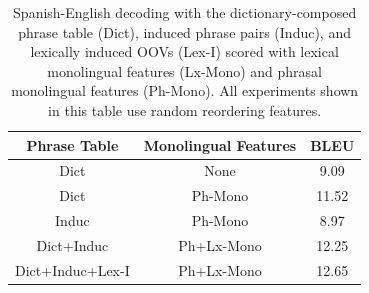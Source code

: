 \documentclass[11pt]{article}
\begin{document}
\begin{table}
\small
\begin{center}
\begin{tabular}{|c|c|c|}
\hline
Phrase Table & Monolingual Features & BLEU \\ %
\hline
Dict & None & 9.09 \\
Dict & Ph-Mono & 11.52 \\
Induc & Ph-Mono &  8.97 \\
Dict+Induc & Ph+Lx-Mono & 12.25 \\
Dict+Induc+Lex-I & Ph+Lx-Mono & 12.65 \\
\hline
\end{tabular}
\caption{Spanish-English decoding with the dictionary-composed phrase table (Dict), induced phrase pairs (Induc), and lexically induced OOVs (Lex-I) scored with lexical monolingual features (Lx-Mono) and phrasal monolingual features (Ph-Mono). All experiments shown in this table use random reordering features.}\label{table:new-phrase-tables}
\end{center}
\end{table}


\end{document}

